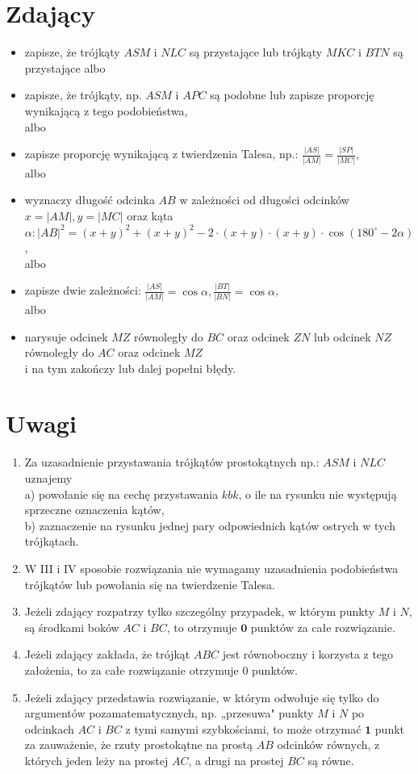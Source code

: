 \documentclass[10pt]{article}
\begin{document}
\section*{Zdający}
\begin{itemize}
  \item zapisze, że trójkąty $A S M$ i $N L C$ są przystające lub trójkąty $M K C$ i $B T N$ są przystające albo
  \item zapisze, że trójkąty, np. $A S M$ i $A P C$ są podobne lub zapisze proporcję wynikającą z tego podobieństwa,\\
albo
  \item zapisze proporcję wynikającą z twierdzenia Talesa, np.: $\frac{|A S|}{|A M|}=\frac{|S P|}{|M C|}$,\\
albo
  \item wyznaczy długość odcinka $A B$ w zależności od długości odcinków $x=|A M|, y=|M C|$ oraz kąta $\alpha:|A B|^{2}=(x+y)^{2}+(x+y)^{2}-2 \cdot(x+y) \cdot(x+y) \cdot \cos \left(180^{\circ}-2 \alpha\right)$,\\
albo
  \item zapisze dwie zależności: $\frac{|A S|}{|A M|}=\cos \alpha, \frac{|B T|}{|B N|}=\cos \alpha$,\\
albo
  \item narysuje odcinek $M Z$ równoległy do $B C$ oraz odcinek $Z N$ lub odcinek $N Z$ równoległy do $A C$ oraz odcinek $M Z$\\
i na tym zakończy lub dalej popełni błędy.
\end{itemize}

\section*{Uwagi}
\begin{enumerate}
  \item Za uzasadnienie przystawania trójkątów prostokątnych np.: $A S M$ i $N L C$ uznajemy\\
a) powołanie się na cechę przystawania $k b k$, o ile na rysunku nie występują sprzeczne oznaczenia kątów,\\
b) zaznaczenie na rysunku jednej pary odpowiednich kątów ostrych w tych trójkątach.
  \item W III i IV sposobie rozwiązania nie wymagamy uzasadnienia podobieństwa trójkątów lub powołania się na twierdzenie Talesa.
  \item Jeżeli zdający rozpatrzy tylko szczególny przypadek, w którym punkty $M$ i $N$, są środkami boków $A C$ i $B C$, to otrzymuje $\mathbf{0}$ punktów za całe rozwiązanie.
  \item Jeżeli zdający zakłada, że trójkąt $A B C$ jest równoboczny i korzysta z tego założenia, to za całe rozwiązanie otrzymuje 0 punktów.
  \item Jeżeli zdający przedstawia rozwiązanie, w którym odwołuje się tylko do argumentów pozamatematycznych, np. „przesuwa" punkty $M$ i $N$ po odcinkach $A C$ i $B C$ z tymi samymi szybkościami, to może otrzymać $\mathbf{1}$ punkt za zauważenie, że rzuty prostokątne na prostą $A B$ odcinków równych, z których jeden leży na prostej $A C$, a drugi na prostej $B C$ są równe.
\end{enumerate}
\end{document}
